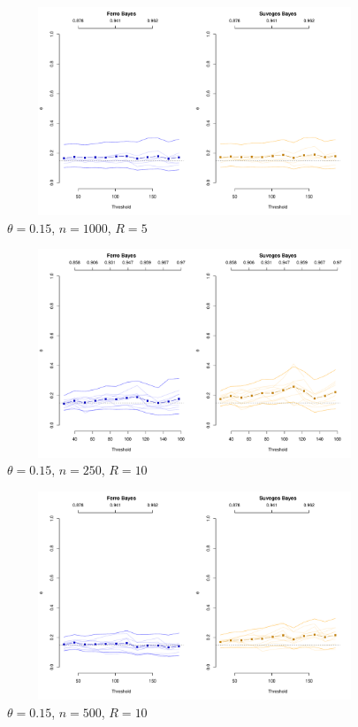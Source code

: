 \documentclass[12pt]{article}
\begin{document}
\begin{figure}
\begin{center}
\includegraphics[width=5.5in, height=2.45in]{../extremal_comparison/figs/sim_frechet_hier_15_1000_5.pdf}
\caption{$\theta=0.15$, $n=1000$, $R=5$}
\end{center}
\end{figure}

\newpage

\begin{figure}
\begin{center}
\includegraphics[width=5.5in, height=2.45in]{../extremal_comparison/figs/sim_frechet_hier_15_250_10.pdf}
\caption{$\theta=0.15$, $n=250$, $R=10$}
\end{center}
\end{figure}

\begin{figure}
\begin{center}
\includegraphics[width=5.5in, height=2.45in]{../extremal_comparison/figs/sim_frechet_hier_15_500_10.pdf}
\caption{$\theta=0.15$, $n=500$, $R=10$}
\end{center}
\end{figure}
\end{document}
